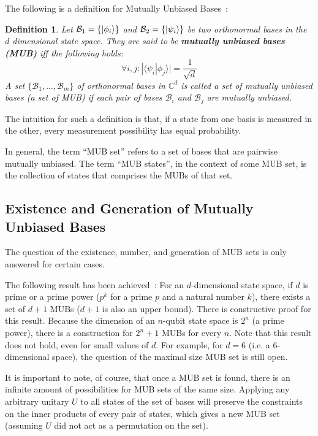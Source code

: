 \documentclass[a4paper,12pt]{article}
\newcommand{\base}{\mathcal{B}}
\newtheorem{definition}{Definition}
\begin{document}
The following is a definition for Mutually Unbiased Bases~\cite{bandyopadhyay_new_2002}:
\begin{definition}
    Let $\base_1 = \{\ket{\phi_i}\}$ and $\base_2 = \{\ket{\psi_i}\}$ be two orthonormal bases in the $d$ dimensional state space.
    They are said to be \textbf{mutually unbiased bases (MUB)} iff the following holds:
    \begin{equation}
        \forall i,j : |\langle \psi_i | \phi_j \rangle | = \frac{1}{\sqrt{d}}
    \end{equation}
    A set $\{\base_1,\dots,\base_m\}$ of orthonormal bases in $\mathbb{C}^d$ is called a \emph{set of mutually unbiased bases} (a set of MUB) if each pair of bases $\base_i$ and $\base_j$ are mutually unbiased.
\end{definition}

The intuition for such a definition is that, if a state from one basis is measured in the other, every measurement possibility has equal probability.

In general, the term ``MUB set'' refers to a set of bases that are pairwise mutually unbiased.
The term ``MUB states'', in the context of some MUB set, is the collection of states that comprises the MUBs of that set.

\subsection{Existence and Generation of Mutually Unbiased Bases} \label{subsec:mub_gen}
The question of the existence, number, and generation of MUB sets is only answered for certain cases.

The following result has been achieved~\cite{bandyopadhyay_new_2002}:
For an $d$-dimensional state space, if $d$ is prime or a prime power ($p^k$ for a prime $p$ and a natural number $k$), there exists a set of $d+1$ MUBs ($d+1$ is also an upper bound).
There is constructive proof for this result.
Because the dimension of an $n$-qubit state space is $2^n$ (a prime power), there is a construction for $2^n+1$ MUBs for every $n$.
Note that this result does not hold, even for small values of $d$. For example, for $d=6$ (i.e. a 6-dimensional space), the question of the maximal size MUB set is still open.

It is important to note, of course, that once a MUB set is found, there is an infinite amount of possibilities for MUB sets of the same size. Applying any arbitrary unitary $U$ to all states of the set of bases will preserve the constraints on the inner products of every pair of states, which gives a new MUB set (assuming $U$ did not act as a permutation on the set).
\end{document}
